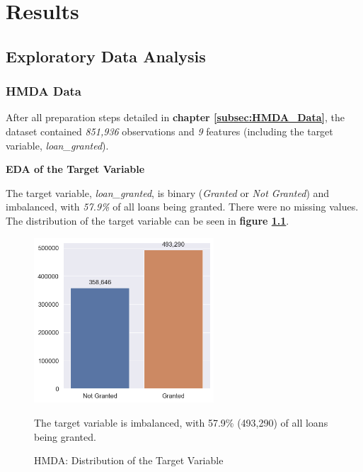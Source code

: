 \chapter{Results}\label{chap:Results}

\section{Exploratory Data Analysis}\label{sec:Exploratory_Data_Analysis}

\subsection{HMDA Data}\label{subsec:HMDA_EDA}

After all preparation steps detailed in \textbf{chapter \ref{subsec:HMDA_Data}}, the dataset contained \textit{851,936} observations and \textit{9} features (including the target variable, \textit{loan\_granted}). 

\textbf{EDA of the Target Variable}

The target variable, \textit{loan\_granted}, is binary (\textit{Granted} or \textit{Not Granted}) and imbalanced, with \textit{57.9\%} of all loans being granted. 
There were no missing values. The distribution of the target variable can be seen in \textbf{figure \ref{fig:CHXX_Target_Variable_Distribution}}.

\begin{figure}[h]
    \centering
    \includegraphics[width=0.6\textwidth]{images/CHXX_Target_Variable_Distribution.png}
    \caption{HMDA: Distribution of the Target Variable}
    \medskip
    \small
    The target variable is imbalanced, with 57.9\% (493,290) of all loans being granted.
    \label{fig:CHXX_Target_Variable_Distribution}
\end{figure}

